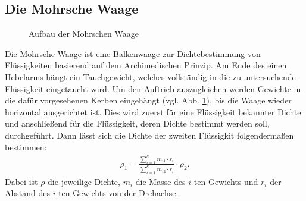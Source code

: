 \subsection{Die Mohrsche Waage}
%
\begin{figure}[!htbp]
\centering
\resizebox{0.5\textwidth}{!}{}
\caption{Aufbau der Mohrschen Waage \cite{LP:Online}}
\label{img:mohrsche}
\end{figure}
%
Die Mohrsche Waage ist eine Balkenwaage zur Dichtebestimmung von Flüssigkeiten basierend auf dem Archimedischen Prinzip. Am Ende des einen Hebelarms hängt ein Tauchgewicht, welches vollständig in die zu untersuchende Flüssigkeit eingetaucht wird. Um den Auftrieb auszugleichen werden Gewichte in die dafür vorgesehenen Kerben eingehängt (vgl. Abb. \ref{img:mohrsche}), bis die Waage wieder horizontal ausgerichtet ist. Dies wird zuerst für eine Flüssigkeit bekannter Dichte und anschließend für die Flüssigkeit, deren Dichte bestimmt werden soll, durchgeführt. Dann lässt sich die Dichte der zweiten Flüssigkit folgendermaßen bestimmen:\cite{LP:Online}
%
\begin{align}
	\rho_1=\frac{\sum_{i=1}^{k}m_{i1} \cdot r_i}{\sum_{i=1}^{k}m_{i2} \cdot r_i}\cdot\rho_2.
	\label{eq:mohrsche}
\end{align}
%
Dabei ist $\rho$ die jeweilige Dichte, $m_i$ die Masse des $i$-ten Gewichts und $r_i$ der Abstand des $i$-ten Gewichts von  der Drehachse.